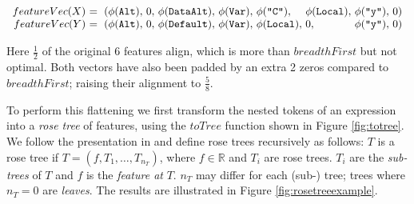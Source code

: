 \begin{small}
  \begin{equation*}\label{eq:flattened}
    \begin{array}{r@{}l@{}l@{}l@{}l@{}l@{}l@{}l@{}l@{}l}
      featureVec(X)\ &=\ (\feature{\CAlt},\ &0,\ &\feature{\CDataAlt},\ &\feature{\CVar},\ &\feature{\id{C}},\  &\feature{\CLocal},\ &\feature{\id{y}},\ &0 &) \\
      featureVec(Y)\ &=\ (\feature{\CAlt},\ &0,\ &\feature{\CDefault},\ &\feature{\CVar},\ &\feature{\CLocal},\ &0,\                 &\feature{\id{y}},\ &0 &)
    \end{array}
  \end{equation*}
\end{small}

Here $\frac{1}{2}$ of the original 6 features align, which is more than $breadthFirst$ but not optimal. Both vectors have also been padded by an extra 2 zeros compared to $breadthFirst$; raising their alignment to $\frac{5}{8}$.

To perform this flattening we first transform the nested tokens of an expression into a \emph{rose tree} of features, using the $toTree$ function shown in Figure \ref{fig:totree}. We follow the presentation in \citep{blundell2012bayesian} and define rose trees recursively as follows: $T$ is a rose tree if $T = (f, T_1, \dots, T_{n_T})$, where $f \in \mathbb{R}$ and $T_i$ are rose trees. $T_i$ are the \emph{sub-trees} of $T$ and $f$ is the \emph{feature at} $T$. $n_T$ may differ for each (sub-) tree; trees where $n_T = 0$ are \emph{leaves}. The results are illustrated in Figure \ref{fig:rosetreeexample}.

